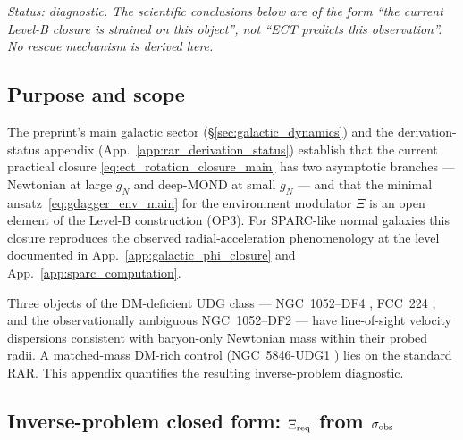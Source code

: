 \textit{Status: diagnostic.  The scientific conclusions below are of
the form ``the current Level-B closure is strained on this object'',
not ``ECT predicts this observation''.  No rescue mechanism is
derived here.}

\subsection{Purpose and scope}
\label{app:udg:purpose}

The preprint's main galactic sector (\S\ref{sec:galactic_dynamics})
and the derivation-status appendix
(App.~\ref{app:rar_derivation_status}) establish that the current
practical closure \eqref{eq:ect_rotation_closure_main} has two
asymptotic branches --- Newtonian at large $g_N$ and deep-MOND at
small $g_N$ --- and that the minimal
ansatz~\eqref{eq:gdagger_env_main} for the environment modulator
$\Xi$ is an open element of the Level-B construction (OP3).  For
SPARC-like normal galaxies this closure reproduces the observed
radial-acceleration phenomenology at the level documented in
App.~\ref{app:galactic_phi_closure} and
App.~\ref{app:sparc_computation}.

Three objects of the DM-deficient UDG class --- NGC~1052--DF4
\cite{Danieli2022DF4,vanDokkum2018}, FCC~224
\cite{Buzzo2025FCC224,Tang2025FCC224}, and the observationally
ambiguous NGC~1052--DF2
\cite{Trujillo2019DF2,Shen2021DF2TRGB,vanDokkum2018} ---
have line-of-sight velocity dispersions consistent with
baryon-only Newtonian mass within their probed radii.  A
matched-mass DM-rich control (NGC~5846-UDG1
\cite{Forbes2021NGC5846UDG1}) lies on the standard RAR.  This
appendix quantifies the resulting inverse-problem diagnostic.

\subsection{Inverse-problem closed form: $\Xi_{\rm req}$ from
$\sigma_{\rm obs}$}
\label{app:udg:inverse_closed_form}

